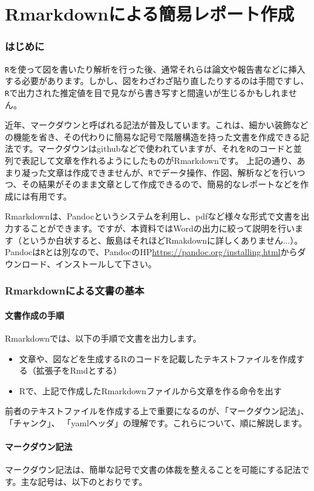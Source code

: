 \part{Rmarkdownによる簡易レポート作成}
\label{rmarkdown}
\section{はじめに}
\verb|R|を使って図を書いたり解析を行った後、通常それらは論文や報告書などに挿入する必要があります。しかし、図をわざわざ貼り直したりするのは手間ですし、\verb|R|で出力された推定値を目で見ながら書き写すと間違いが生じるかもしれません。

近年、マークダウンと呼ばれる記法が普及しています。これは、細かい装飾などの機能を省き、その代わりに簡易な記号で階層構造を持った文書を作成できる記法です。マークダウンはgithubなどで使われていますが、それを\verb|R|のコードと並列で表記して文章を作れるようにしたものがRmarkdownです。
上記の通り、あまり凝った文章は作成できませんが、\verb|R|でデータ操作、作図、解析などを行いつつ、その結果がそのまま文章として作成できるので、簡易的なレポートなどを作成には有用です。

Rmarkdownは、Pandocというシステムを利用し、pdfなど様々な形式で文書を出力することができます。ですが、本資料ではWordの出力に絞って説明を行います（というか白状すると、飯島はそれほどRmakdownに詳しくありません...）。Pandocは\texttt{R}とは別なので、PandocのHP\url{https://pandoc.org/installing.html}からダウンロード、インストールして下さい。

\section{Rmarkdownによる文書の基本}
\subsection{文書作成の手順}
Rmarkdownでは、以下の手順で文書を出力します。
\begin{itemize}
  \item 文章や、図などを生成するRのコードを記載したテキストファイルを作成する（拡張子をRmdとする）
  \item Rで、上記で作成したRmarkdownファイルから文章を作る命令を出す
\end{itemize}

前者のテキストファイルを作成する上で重要になるのが、「マークダウン記法」、「チャンク」、 「yamlヘッダ」の理解です。これらについて、順に解説します。

    \subsection{マークダウン記法}
マークダウン記法は、簡単な記号で文書の体裁を整えることを可能にする記法です。主な記号は、以下のとおりです。

